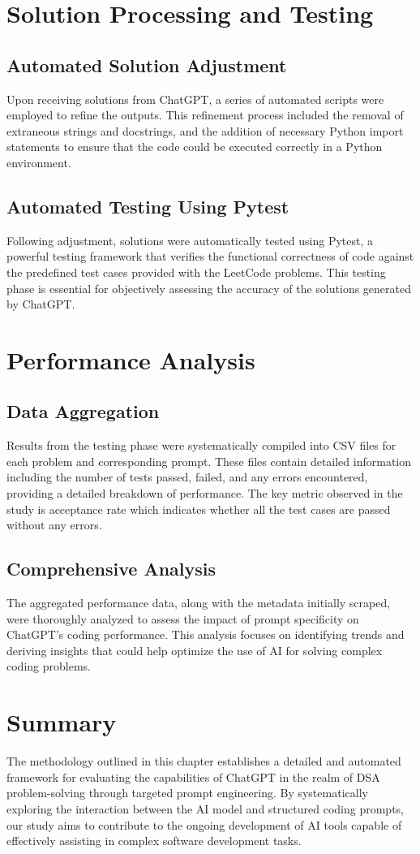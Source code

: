 \section{Solution Processing and Testing}
\subsection{Automated Solution Adjustment}
Upon receiving solutions from ChatGPT, a series of automated scripts were employed to refine the outputs. This refinement process included the removal of extraneous strings and docstrings, and the addition of necessary Python import statements to ensure that the code could be executed correctly in a Python environment.

\subsection{Automated Testing Using Pytest}
Following adjustment, solutions were automatically tested using Pytest, a powerful testing framework that verifies the functional correctness of code against the predefined test cases provided with the LeetCode problems. This testing phase is essential for objectively assessing the accuracy of the solutions generated by ChatGPT.

\section{Performance Analysis}
\subsection{Data Aggregation}
Results from the testing phase were systematically compiled into CSV files for each problem and corresponding prompt. These files contain detailed information including the number of tests passed, failed, and any errors encountered, providing a detailed breakdown of performance. The key metric observed in the study is acceptance rate which indicates whether all the test cases are passed without any errors. 

\subsection{Comprehensive Analysis}
The aggregated performance data, along with the metadata initially scraped, were thoroughly analyzed to assess the impact of prompt specificity on ChatGPT’s coding performance. This analysis focuses on identifying trends and deriving insights that could help optimize the use of AI for solving complex coding problems.

\section{Summary}
The methodology outlined in this chapter establishes a detailed and automated framework for evaluating the capabilities of ChatGPT in the realm of DSA problem-solving through targeted prompt engineering. By systematically exploring the interaction between the AI model and structured coding prompts, our study aims to contribute to the ongoing development of AI tools capable of effectively assisting in complex software development tasks.
